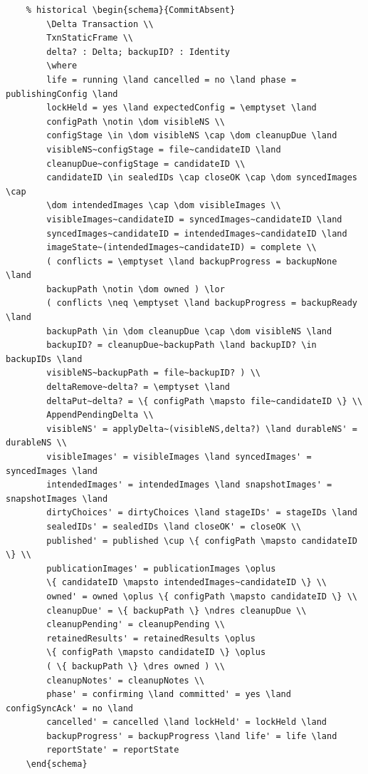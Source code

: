 \documentclass{article}
\begin{document}
\begin{verbatim}
	% historical \begin{schema}{CommitAbsent}
		\Delta Transaction \\
		TxnStaticFrame \\
		delta? : Delta; backupID? : Identity
		\where
		life = running \land cancelled = no \land phase = publishingConfig \land
		lockHeld = yes \land expectedConfig = \emptyset \land
		configPath \notin \dom visibleNS \\
		configStage \in \dom visibleNS \cap \dom cleanupDue \land
		visibleNS~configStage = file~candidateID \land
		cleanupDue~configStage = candidateID \\
		candidateID \in sealedIDs \cap closeOK \cap \dom syncedImages \cap
		\dom intendedImages \cap \dom visibleImages \\
		visibleImages~candidateID = syncedImages~candidateID \land
		syncedImages~candidateID = intendedImages~candidateID \land
		imageState~(intendedImages~candidateID) = complete \\
		( conflicts = \emptyset \land backupProgress = backupNone \land
		backupPath \notin \dom owned ) \lor
		( conflicts \neq \emptyset \land backupProgress = backupReady \land
		backupPath \in \dom cleanupDue \cap \dom visibleNS \land
		backupID? = cleanupDue~backupPath \land backupID? \in backupIDs \land
		visibleNS~backupPath = file~backupID? ) \\
		deltaRemove~delta? = \emptyset \land
		deltaPut~delta? = \{ configPath \mapsto file~candidateID \} \\
		AppendPendingDelta \\
		visibleNS' = applyDelta~(visibleNS,delta?) \land durableNS' = durableNS \\
		visibleImages' = visibleImages \land syncedImages' = syncedImages \land
		intendedImages' = intendedImages \land snapshotImages' = snapshotImages \land
		dirtyChoices' = dirtyChoices \land stageIDs' = stageIDs \land
		sealedIDs' = sealedIDs \land closeOK' = closeOK \\
		published' = published \cup \{ configPath \mapsto candidateID \} \\
		publicationImages' = publicationImages \oplus
		\{ candidateID \mapsto intendedImages~candidateID \} \\
		owned' = owned \oplus \{ configPath \mapsto candidateID \} \\
		cleanupDue' = \{ backupPath \} \ndres cleanupDue \\
		cleanupPending' = cleanupPending \\
		retainedResults' = retainedResults \oplus
		\{ configPath \mapsto candidateID \} \oplus
		( \{ backupPath \} \dres owned ) \\
		cleanupNotes' = cleanupNotes \\
		phase' = confirming \land committed' = yes \land configSyncAck' = no \land
		cancelled' = cancelled \land lockHeld' = lockHeld \land
		backupProgress' = backupProgress \land life' = life \land
		reportState' = reportState
	\end{schema}


\end{verbatim}
\end{document}
